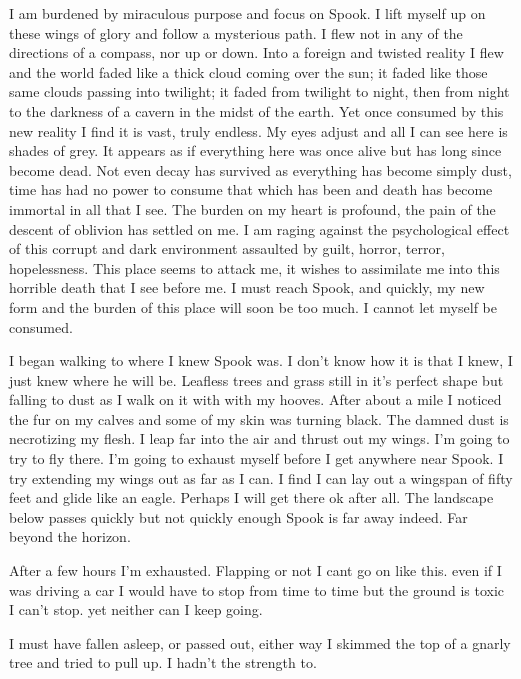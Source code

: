 I am burdened by miraculous purpose and focus on Spook. I lift myself up on these wings of glory and follow a mysterious path. I flew not in any of the directions of a compass, nor up or down. Into a foreign and twisted reality I flew and the world faded like a thick cloud coming over the sun; it faded like those same clouds passing into twilight; it faded from twilight to night, then from night to the darkness of a cavern in the midst of the earth. Yet once consumed by this new reality I find it is vast, truly endless. My eyes adjust and all I can see here is shades of grey. It appears as if everything here was once alive but has long since become dead. Not even decay has survived as everything has become simply dust, time has had no power to consume that which has been and death has become immortal in all that I see. The burden on my heart is profound, the pain of the descent of oblivion has settled on me. I am raging against the psychological effect of this corrupt and dark environment assaulted by guilt, horror, terror, hopelessness. This place seems to attack me, it wishes to assimilate me into this horrible death that I see before me. I must reach Spook, and quickly, my new form and the burden of this place will soon be too much. I cannot let myself be consumed.

I began walking to where I knew Spook was. I don't know how it is that I knew, I just knew where he will be. Leafless trees and grass still in it's perfect shape but falling to dust as I walk on it with with my hooves. After about a mile I noticed the fur on my calves and some of my skin was turning black. The damned dust is necrotizing my flesh. I leap far into the air and thrust out my wings. I'm going to try to fly there. I'm going to exhaust myself before I get anywhere near Spook. I try extending my wings out as far as I can. I find I can lay out a wingspan of fifty feet and glide like an eagle. Perhaps I will get there ok after all. The landscape below passes quickly but not quickly enough Spook is far away indeed. Far beyond the horizon.

After a few hours I'm exhausted. Flapping or not I cant go on like this. even if I was driving a car I would have to stop from time to time but the ground is toxic I can't stop. yet neither can I keep going.

I must have fallen asleep, or passed out, either way I skimmed the top of a gnarly tree and tried to pull up. I hadn't the strength to. 



















